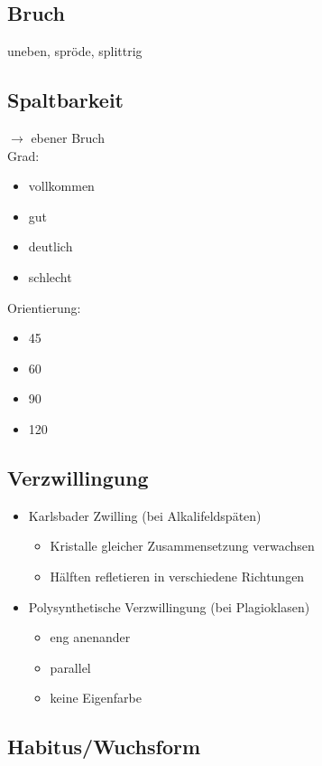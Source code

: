 \documentclass[a4, 12pt]{scrreprt}
\begin{document}
\subsection{Bruch}
uneben, spröde, splittrig

\subsection{Spaltbarkeit}

$\rightarrow$ ebener Bruch\\

Grad:
\begin{itemize}
\item vollkommen
\item gut
\item deutlich
\item schlecht
\end{itemize}

Orientierung:
\begin{itemize}
\item 45
\item 60
\item 90
\item 120
\end{itemize}

\subsection{Verzwillingung}

\begin{itemize}
\item Karlsbader Zwilling (bei Alkalifeldspäten)
\begin{itemize}
\item Kristalle gleicher Zusammensetzung verwachsen
\item Hälften refletieren in verschiedene Richtungen
\end{itemize}
\item Polysynthetische Verzwillingung (bei Plagioklasen)
\begin{itemize}
\item eng anenander
\item parallel
\item keine Eigenfarbe
\end{itemize}
\end{itemize}

\subsection{Habitus/Wuchsform}
\end{document}
